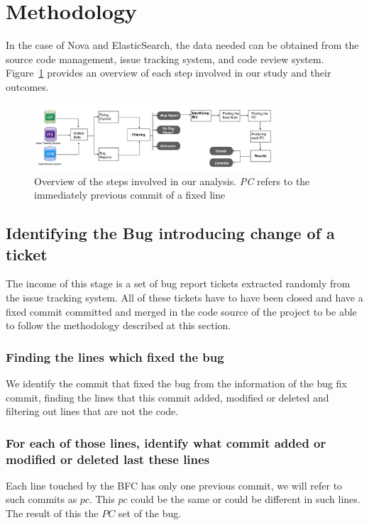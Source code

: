 \documentclass[conference]{IEEEtran}
\begin{document}
\section{Methodology}
\label{sec:methodology}
In the case of Nova and ElasticSearch, the data needed can be obtained from the source code management, issue tracking system, and code review system. Figure~\ref{fig:diagram} provides an overview of each step involved in our study and their outcomes.
\begin{figure}[ht]
\centering
\includegraphics[height=2.5cm]{diagram.png}
\caption{Overview of the steps involved in our analysis. \emph{PC} refers to the immediately previous commit of a fixed line }
\label{fig:diagram}       %
\end{figure}

\subsection{Identifying the Bug introducing change of a ticket}
\label{sec:methodologySS}
The income of this stage is a set of bug report tickets extracted randomly from the issue tracking system. All of these tickets have to have been closed and have a fixed commit committed and merged in the code source of the project to be able to follow the methodology described at this section.

\subsubsection{Finding the lines which fixed the bug}
We identify the commit that fixed the bug from the information of the bug fix commit, finding the lines that this commit added, modified or deleted and filtering out lines that are not the code.
	
\subsubsection{For each of those lines, identify what commit added or modified or deleted last these lines}

Each line touched by the BFC has only one previous commit, we will refer to such commits as $pc$. This $pc$ could be the same or could be different in such lines. The result of this the $PC$ set of the bug.
\end{document}
